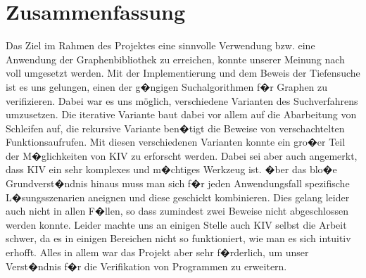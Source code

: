 ﻿\chapter{Zusammenfassung}
\label{chap:zusammenfassung}

Das Ziel im Rahmen des Projektes eine sinnvolle Verwendung bzw. eine Anwendung der Graphenbibliothek zu erreichen, konnte unserer Meinung nach voll umgesetzt werden. Mit der Implementierung und dem Beweis der Tiefensuche ist es uns gelungen, einen der g�ngigen Suchalgorithmen f�r Graphen zu verifizieren. Dabei war es uns möglich, verschiedene Varianten des Suchverfahrens umzusetzen. Die iterative Variante baut dabei vor allem auf die Abarbeitung von Schleifen auf, die rekursive Variante ben�tigt die Beweise von verschachtelten Funktionsaufrufen. Mit diesen verschiedenen Varianten konnte ein gro�er Teil der M�glichkeiten von KIV zu erforscht werden. Dabei sei aber auch angemerkt, dass KIV ein sehr komplexes und m�chtiges Werkzeug ist. �ber das blo�e Grundverst�ndnis hinaus muss man sich f�r jeden Anwendungsfall spezifische L�sungsszenarien aneignen und diese geschickt kombinieren. Dies gelang leider auch nicht in allen F�llen, so dass zumindest zwei Beweise nicht abgeschlossen werden konnte. Leider machte uns an einigen Stelle auch KIV selbst die Arbeit schwer, da es in einigen Bereichen nicht so funktioniert, wie man es sich intuitiv erhofft. Alles in allem war das Projekt aber sehr f�rderlich, um unser Verst�ndnis f�r die Verifikation von Programmen zu erweitern.  
